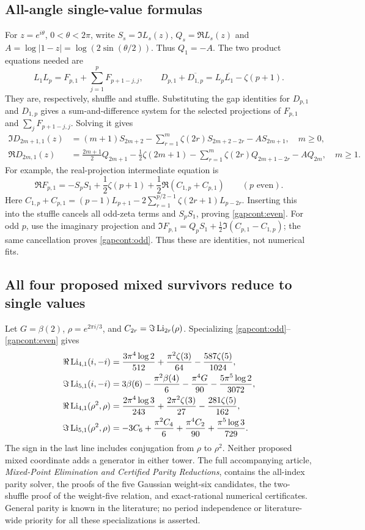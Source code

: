 \subsection{All-angle single-value formulas}
For $z=e^{i\theta}$, $0<\theta<2\pi$, write
$S_s=\Im L_s(z)$, $Q_s=\Re L_s(z)$ and
$A=\log|1-z|=\log(2\sin(\theta/2))$. Thus $Q_1=-A$.
The two product equations needed are
\[
L_1L_p=F_{p,1}+\sum_{j=1}^{p}F_{p+1-j,j},\qquad
D_{p,1}+\overline{D_{1,p}}=L_p\overline{L_1}-\zeta(p+1).
\]
They are, respectively, shuffle and stuffle. Substituting the gap identities
for $D_{p,1}$ and $D_{1,p}$ gives a sum-and-difference system for the selected
projections of $F_{p,1}$ and $\sum_jF_{p+1-j,j}$. Solving it gives
\begin{align}
\Im D_{2m+1,1}(z)
&=(m+1)S_{2m+2}-\sum_{r=1}^{m}\zeta(2r)S_{2m+2-2r}-A S_{2m+1},
\quad m\ge0,\label{gapcont:odd}\\
\Re D_{2m,1}(z)
&=\frac{2m+1}{2}Q_{2m+1}-\frac12\zeta(2m+1)
-\sum_{r=1}^{m}\zeta(2r)Q_{2m+1-2r}-A Q_{2m},
\quad m\ge1.\label{gapcont:even}
\end{align}
For example, the real-projection intermediate equation is
\[
\Re F_{p,1}=-S_pS_1+\frac12\zeta(p+1)
+\frac12\Re(C_{1,p}+C_{p,1})\qquad(p\text{ even}).
\]
Here $C_{1,p}+C_{p,1}=(p-1)L_{p+1}-2\sum_{r=1}^{p/2-1}\zeta(2r+1)L_{p-2r}$.
Inserting this into the stuffle cancels all odd-zeta terms and $S_pS_1$, proving
\eqref{gapcont:even}. For odd $p$, use the imaginary projection and
$\Im F_{p,1}=Q_pS_1+\tfrac12\Im(C_{p,1}-C_{1,p})$; the same cancellation proves
\eqref{gapcont:odd}. Thus these are identities, not numerical fits.

\subsection{All four proposed mixed survivors reduce to single values}
Let $G=\beta(2)$, $\rho=e^{2\pi i/3}$, and $C_{2r}=\Im\operatorname{Li}_{2r}(\rho)$.
Specializing \eqref{gapcont:odd}--\eqref{gapcont:even} gives
\begin{align}
\Re\operatorname{Li}_{4,1}(i,-i)
&=\frac{3\pi^4\log2}{512}+\frac{\pi^2\zeta(3)}{64}-\frac{587\zeta(5)}{1024},
\label{gapcont:gauss-real}\\
\Im\operatorname{Li}_{5,1}(i,-i)
&=3\beta(6)-\frac{\pi^2\beta(4)}6-\frac{\pi^4G}{90}
-\frac{5\pi^5\log2}{3072},\label{gapcont:gauss-imag}\\
\Re\operatorname{Li}_{4,1}(\rho^2,\rho)
&=\frac{2\pi^4\log3}{243}+\frac{2\pi^2\zeta(3)}{27}
-\frac{281\zeta(5)}{162},\label{gapcont:eis-real}\\
\Im\operatorname{Li}_{5,1}(\rho^2,\rho)
&=-3C_6+\frac{\pi^2C_4}{6}+\frac{\pi^4C_2}{90}
+\frac{\pi^5\log3}{729}.\label{gapcont:eis-imag}
\end{align}
The sign in the last line includes conjugation from $\rho$ to $\rho^2$.
Neither proposed mixed coordinate adds a generator in either tower.
The full accompanying article, \emph{Mixed-Point Elimination and Certified
Parity Reductions}, contains the all-index parity solver, the proofs of the
five Gaussian weight-six candidates, the two-shuffle proof of the weight-five
relation, and exact-rational numerical certificates. General parity is known
in the literature; no period independence or literature-wide priority for all
these specializations is asserted.
\endgroup
